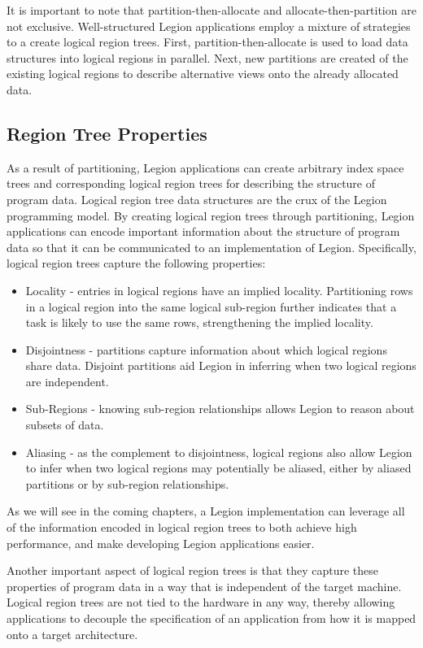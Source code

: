 It is important to note that partition-then-allocate and
allocate-then-partition are not exclusive.  Well-structured
Legion applications employ a mixture of strategies to a 
create logical region trees.  First, partition-then-allocate 
is used to load data structures into logical regions in 
parallel.  Next, new partitions are created of the
existing logical regions to describe alternative views
onto the already allocated data.

\subsection{Region Tree Properties}
\label{subsec:treeprop}
As a result of partitioning, Legion applications can
create arbitrary index space trees and corresponding
logical region trees for describing the structure of
program data. Logical region tree data structures are
the crux of the Legion programming model. By creating
logical region trees through partitioning, Legion
applications can encode important information about
the structure of program data so that it can be
communicated to an implementation of Legion. Specifically,
logical region trees capture the following properties:
\begin{itemize}
\item Locality - entries in logical regions have an
      implied locality. Partitioning rows in a logical
      region into the same logical sub-region further
      indicates that a task is likely to use the same
      rows, strengthening the implied locality.
\item Disjointness - partitions capture information about
      which logical regions share data. Disjoint
      partitions aid Legion in inferring when two
      logical regions are independent.
\item Sub-Regions - knowing sub-region relationships
      allows Legion to reason about subsets of data.
\item Aliasing - as the complement to disjointness,
      logical regions also allow Legion to infer
      when two logical regions may potentially be
      aliased, either by aliased partitions or by
      sub-region relationships.
\end{itemize}
As we will see in the coming chapters, a Legion
implementation can leverage all of the information
encoded in logical region trees to both achieve
high performance, and make developing Legion 
applications easier.

Another important aspect of logical region trees
is that they capture these properties of program
data in a way that is independent of the target
machine. Logical region trees are not tied to
the hardware in any way, thereby allowing applications
to decouple the specification of an application 
from how it is mapped onto a target architecture.


